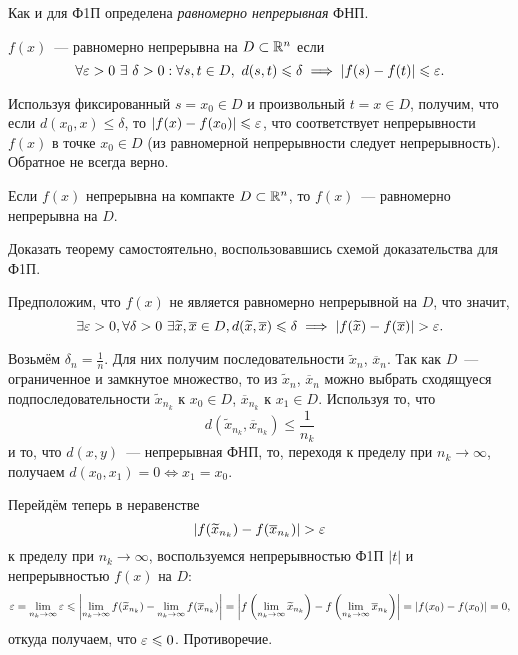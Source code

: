 \documentclass[../../main.tex]{subfiles}
\begin{document}
	Как и для Ф1П определена \emph{равномерно непрерывная} ФНП.
	\begin{defn}
		$f(x)$~--- равномерно непрерывна на $D \subset \mathbb{R}^n$ если 
		\[
			\forall \eps > 0 \ \exists \ \delta > 0 : \forall s, t \in D,\ 
			d(s, t) \leq \delta \implies |f(s) - f(t)| \leq \eps.
		\]
	\end{defn}
	
	Используя фиксированный $s = x_0 \in D$ и произвольный $t = x \in D$, 
	получим, что если $d(x_0, x) \leq \delta$, то $|f(x) - f(x_0)| \leqslant \varepsilon$,
	что соответствует непрерывности $f(x)$ в точке $x_0 \in D$ (из равномерной 
	непрерывности следует непрерывность). Обратное не всегда верно.
	
	\begin{thm}[Кантор]
		Если $f(x)$ непрерывна на компакте $D \subset \mathbb{R}^n$, то $f(x)$~---
		равномерно непрерывна на $D$.
	\end{thm} 
	
	\begin{exc}
		Доказать теорему самостоятельно, воспользовавшись 
		схемой доказательства для Ф1П.
	\end{exc}
	\begin{eans}
		Предположим, что $f(x)$ не является равномерно непрерывной на $D$, что 
		значит,
		\[\exists \varepsilon > 0, \forall \delta > 0\ \exists \widetilde{x}, 
		\overline{x}\in D, d(\widetilde{x}, \overline{x})\leqslant \delta \implies 
		\left|{f(\widetilde{x}) - f(\overline{x})}\right| > \varepsilon.\]
		
		Возьмём $\delta_n = \frac{1}{n}$. Для них получим последовательности 
		$\widetilde{x}_n$, $\overline{x}_n$. Так как $D$~--- ограниченное и 
		замкнутое множество, то из $\widetilde{x}_n$, $\overline{x}_n$ можно выбрать 
		сходящуеся подпоследовательности $\widetilde{x}_{n_k}$ к $x_0\in D$, 
		$\overline{x}_{n_k}$ к $x_1\in D$. Используя то, что
		\[d(\widetilde{x}_{n_k}, \overline{x}_{n_k})\leq\frac{1}{n_k}\]
		и то, что $d(x, y)$~--- непрерывная ФНП, то, переходя к пределу при 
		$n_k\to\infty$, получаем $d(x_0, x_1) = 0 \iff x_1 = x_0$.
		
		Перейдём теперь в неравенстве
		\[\left|{f(\widetilde{x}_{n_k}) - f(\overline{x}_{n_k})}\right| > \varepsilon\]
		к пределу при $n_k\to\infty$, воспользуемся непрерывностью Ф1П $|t|$ и 
		непрерывностью $f(x)$ на $D$:
		\[\varepsilon = \lim_{n_k\to\infty}\varepsilon \leqslant
		\left|{\lim_{n_k\to\infty}f(\widetilde{x}_{n_k}) - 
		\lim_{n_k\to\infty}f(\overline{x}_{n_k})}\right| = 
		\left|{f\left(\lim_{n_k\to\infty}\widetilde{x}_{n_k}\right) - 
		f\left(\lim_{n_k\to\infty}\overline{x}_{n_k}\right)}\right| = \left|{f(x_0) - f(x_0)}\right| 
		= 0,\]
		откуда получаем, что $\varepsilon \leqslant 0$. Противоречие.
	\end{eans}
\end{document}
